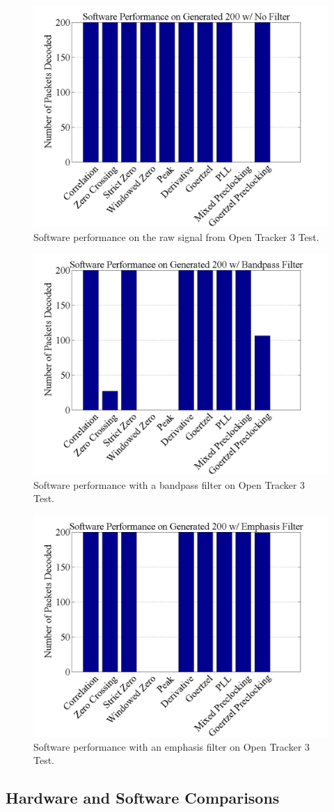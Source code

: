 \begin{figure}
  \centering
	\includegraphics[width=0.75\linewidth]{images/SoftwarePerformanceonGenerated200wNoFilter.png} 
	\caption{Software performance on the raw signal from Open Tracker 3 Test.}
   \label{Gen200FiltNo}
\end{figure}
\begin{figure}
  \centering
	\includegraphics[width=0.75\linewidth]{images/SoftwarePerformanceonGenerated200wBandpassFilter.png} 
	\caption{Software performance with a bandpass filter on Open Tracker 3 Test.}
   \label{Gen200Filt0}
\end{figure}
\begin{figure}
  \centering
	\includegraphics[width=0.75\linewidth]{images/SoftwarePerformanceonGenerated200wEmphasisFilter.png} 
	\caption{Software performance with an emphasis filter on Open Tracker 3 Test.}
   \label{Gen200Filt6}
\end{figure}

\subsection{Hardware and Software Comparisons}

